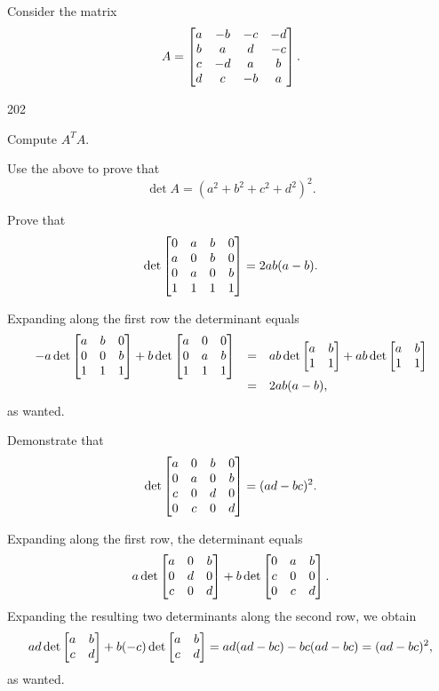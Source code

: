 \begin{pro}
\begin{answer}
\end{answer}
\end{pro}
\begin{pro}
Consider the matrix $$A = \begin{bmatrix}a & -b & -c & -d \cr b  & a
& d & -c \cr c & -d & a & b \cr d & c & -b & a \cr  \end{bmatrix}.$$
\begin{dingautolist}{202}
\item  Compute $A^TA$. \item   Use the above to prove that $$
\det A = (a^2+b^2+c^2+d^2)^2.$$

\end{dingautolist}
\end{pro}
\begin{pro}
Prove that $$\det \begin{bmatrix}0 & a& b & 0 \cr a & 0 & b & 0
\cr 0 & a & 0 & b \cr 1 & 1 & 1& 1\cr
\end{bmatrix} = 2ab(a-b).
$$
\begin{answer} Expanding along the first row the determinant equals
$$\begin{array}{lll}-a\det\begin{bmatrix} a & b & 0 \cr
0 & 0 & b \cr 1 & 1 & 1 \cr \end{bmatrix} + b\det\begin{bmatrix} a
& 0 & 0 \cr 0 & a & b \cr 1 & 1 & 1 \cr\end{bmatrix}  & = &  ab
\det\begin{bmatrix} a & b \cr 1 & 1  \cr
\end{bmatrix} + ab\det\begin{bmatrix} a & b \cr 1 & 1  \cr
\end{bmatrix}  \\ & =  & 2ab (a - b), \end{array}$$as wanted.
\end{answer}
\end{pro}
\begin{pro}
Demonstrate that  $$\det \begin{bmatrix} a & 0 & b & 0 \cr 0 & a &
0 & b \cr c & 0 & d & 0 \cr 0 & c & 0 & d\cr
\end{bmatrix} = (ad - bc)^2.
$$
\begin{answer} Expanding along the first row, the determinant equals
$$ a\det\begin{bmatrix} a & 0 & b \cr 0 & d & 0 \cr c & 0 & d \cr  \end{bmatrix}
+ b \det\begin{bmatrix} 0 & a & b \cr c & 0 & 0 \cr 0 & c & d \cr
\end{bmatrix}.
$$Expanding the resulting two determinants along the second row,
we obtain $$ad\det\begin{bmatrix}a & b \cr c & d\cr \end{bmatrix}
+ b(-c)\det\begin{bmatrix}a & b \cr c & d\cr  \end{bmatrix} =
ad(ad - bc) - bc(ad - bc) = (ad - bc)^2,
$$as wanted.
\end{answer}
\end{pro}
